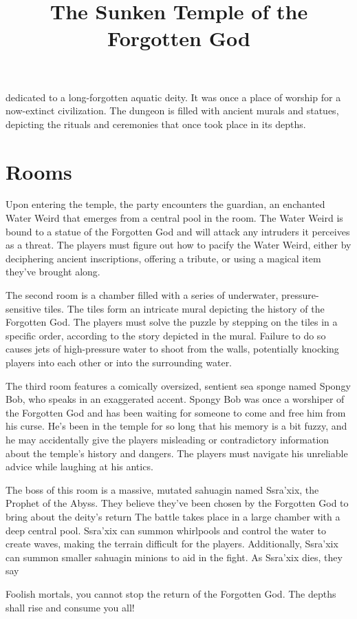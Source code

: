 \documentclass[letterpaper,twocolumn,openany]{dndarticle}
\title{The Sunken Temple of the Forgotten God}
\date{{\quipfont \small\textit{}}}
\begin{document}
\maketitle

 dedicated to a long-forgotten aquatic deity. It was once a place of worship for a now-extinct civilization. The dungeon is filled with ancient murals and statues, depicting the rituals and ceremonies that once took place in its depths.

\section{Rooms}


Upon entering the temple, the party encounters the guardian, an enchanted Water Weird that emerges from a central pool in the room. The Water Weird is bound to a statue of the Forgotten God and will attack any intruders it perceives as a threat. The players must figure out how to pacify the Water Weird, either by deciphering ancient inscriptions, offering a tribute, or using a magical item they've brought along.

The second room is a chamber filled with a series of underwater, pressure-sensitive tiles. The tiles form an intricate mural depicting the history of the Forgotten God. The players must solve the puzzle by stepping on the tiles in a specific order, according to the story depicted in the mural. Failure to do so causes jets of high-pressure water to shoot from the walls, potentially knocking players into each other or into the surrounding water.

The third room features a comically oversized, sentient sea sponge named Spongy Bob, who speaks in an exaggerated accent. Spongy Bob was once a worshiper of the Forgotten God and has been waiting for someone to come and free him from his curse. He's been in the temple for so long that his memory is a bit fuzzy, and he may accidentally give the players misleading or contradictory information about the temple's history and dangers. The players must navigate his unreliable advice while laughing at his antics.


The boss of this room is a massive, mutated sahuagin named Ssra'xix, the Prophet of the Abyss. They believe they've been chosen by the Forgotten God to bring about the deity's return
The battle takes place in a large chamber with a deep central pool. Ssra'xix can summon whirlpools and control the water to create waves, making the terrain difficult for the players. Additionally, Ssra'xix can summon smaller sahuagin minions to aid in the fight.
As Ssra'xix dies, they say
\begin{DndReadAloud}
 Foolish mortals, you cannot stop the return of the Forgotten God. The depths shall rise and consume you all!
\end{DndReadAloud}
\end{document}
